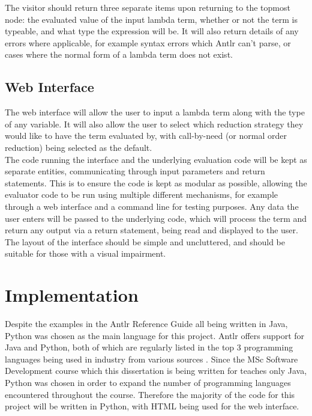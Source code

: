 \documentclass[a4paper,12pt]{report}
\begin{document}
The visitor should return three separate items upon returning to the topmost node: the evaluated value of the input lambda term, whether or not the term is typeable, and what type the expression will be. It will also return details of any errors where applicable, for example syntax errors which Antlr can't parse, or cases where the normal form of a lambda term does not exist.

\subsection{Web Interface}

The web interface will allow the user to input a lambda term along with the type of any variable. It will also allow the user to select which reduction strategy they would like to have the term evaluated by, with call-by-need (or normal order reduction) being selected as the default.\\

The code running the interface and the underlying evaluation code will be kept as separate entities, communicating through input parameters and return statements. This is to ensure the code is kept as modular as possible, allowing the evaluator code to be run using multiple different mechanisms, for example through a web interface and a command line for testing purposes. Any data the user enters will be passed to the underlying code, which will process the term and return any output via a return statement, being read and displayed to the user.\\

The layout of the interface should be simple and uncluttered, and should be suitable for those with a visual impairment.

\section{Implementation}

Despite the examples in the Antlr Reference Guide \cite{Parr2012} all being written in Java, Python was chosen as the main language for this project. Antlr offers support for Java and Python, both of which are regularly listed in the top 3 programming languages being used in industry from various sources \cite{ProgLang1}\cite{ProgLang2}\cite{ProgLang3}. Since the MSc Software Development course which this dissertation is being written for teaches only Java, Python was chosen in order to expand the number of programming languages encountered throughout the course. Therefore the majority of the code for this project will be written in Python, with HTML being used for the web interface.
\end{document}
